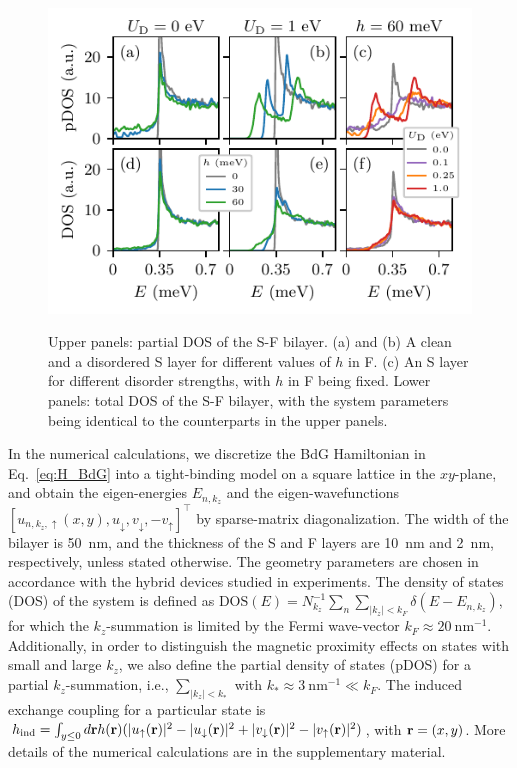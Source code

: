 \documentclass[aps,prl,twocolumn,superscriptaddress,showpacs,longbibliography]{revtex4-1}
\newcommand{\su}{\uparrow}
\newcommand{\sd}{\downarrow}
\newcommand{\tp}{ ^{\intercal} }
\begin{document}
\begin{figure}[t]
\centering
{\includegraphics[width = \linewidth]{Fig_2.pdf}}
\caption{Upper panels: partial DOS of the S-F bilayer. (a) and (b) A clean and a disordered S layer for different values of $h$ in F. (c) An S layer for different disorder strengths, with $h$ in F being fixed. Lower panels: total DOS of the S-F bilayer, with the system parameters being identical to the counterparts in the upper panels. }
\label{fig:Fig_2}
\end{figure}


In the numerical calculations, we discretize the BdG Hamiltonian in Eq.~\eqref{eq:H_BdG} into a tight-binding model on a square lattice in the $xy$-plane, and obtain the eigen-energies $E_{n, k_z}$ and the eigen-wavefunctions $[ u_{n, k_z, \su}(x,y), u_{\sd}, v_{\sd}, -v_{\su} ]\tp$ by sparse-matrix diagonalization. The width of the bilayer is 50~nm, and the thickness of the S and F layers are 10~nm and 2~nm, respectively, unless stated otherwise.
The geometry parameters are chosen in accordance with the hybrid devices studied in experiments.
The density of states (DOS) of the system is defined as $\text{DOS}(E) = N^{-1}_{k_z}\sum_{n} \sum_{|k_z| < k_F} \delta(E - E_{n, k_z})$, for which the $k_z$-summation is limited by the Fermi wave-vector $k_F \approx 20~\text{nm}^{-1}$.
Additionally, in order to distinguish the magnetic proximity effects on states with small and large $k_z$, we also define the partial density of states (pDOS) for a partial $k_z$-summation, i.e., $\sum_{|k_z| < k_*}$ with $k_* \approx 3~\text{nm}^{-1} \ll k_F$. The induced exchange coupling for a particular state is $h_{\text{ind}} = \int_{ y \leq 0} d\bold{r} h(\bold{r})( |u_{\su}(\bold{r})|^2 - |u_{\sd}(\bold{r})|^2 + |v_{\sd}(\bold{r})|^2 -  |v_{\su}(\bold{r})|^2 )$, with $\bold{r}=(x,y)$. 
More details of the numerical calculations are in the supplementary material.
\end{document}

